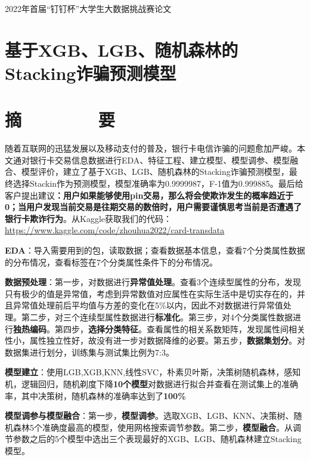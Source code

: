 \pagestyle{plain}
\lfoot{}
\rfoot{}
	\begin{center}
		\heiti {} 2022年首届“钉钉杯”大学生大数据挑战赛论文
		
		\section*{\heiti 基于XGB、LGB、随机森林的Stacking诈骗预测模型}
		\section*{\heiti 摘\ \ \ \ \ \ \ \ 要}
	\end{center}


随着互联网的迅猛发展以及移动支付的普及，银行卡电信诈骗的问题愈加严峻。本文通对银行卡交易信息数据进行EDA、特征工程、建立模型、模型调参、模型融合、模型评价，建立了基于XGB、LGB、随机森林的Stacking诈骗预测模型，最终选择Stackin作为预测模型，模型准确率为0.9999987，F-1值为0.999885。最后给客户提出建议\textbf{：用户如果能够使用pin交易，那么将会使欺诈发生的概率趋近于0；当用户发现当前交易是往期交易的数倍时，用户需要谨慎思考当前是否遭遇了银行卡欺诈行为}。从Kaggle获取我们的代码：\href{github首页}{https://www.kaggle.com/code/zhouhua2022/card-transdata}

\textbf{EDA}：导入需要用到的包，读取数据；查看数据基本信息，查看7个分类属性数据的分布情况，查看标签在7个分类属性条件下的分布情况。


\textbf{数据预处理}：第一步，对数据进行\textbf{异常值处理}。查看3个连续型属性的分布，发现只有极少的值是异常值，考虑到异常数值对应属性在实际生活中是切实存在的，并且异常值处理前后平均值与方差的变化在5\%以内，因此不对数据进行异常值处理。第二步，对三个连续型属性数据进行\textbf{标准化}。第三步，对4个分类属性数据进行\textbf{独热编码}。第四步，\textbf{选择分类特征}。查看属性的相关系数矩阵，发现属性间相关性小，属性独立性好，故没有进一步对数据降维的必要。第五步，\textbf{数据集划分}。对数据集进行划分，训练集与测试集比例为7:3。

\textbf{模型建立}：使用LGB,XGB,KNN,线性SVC，朴素贝叶斯，决策树随机森林，感知机，逻辑回归，随机剃度下降\textbf{10个模型}对数据进行拟合并查看在测试集上的准确率，其中决策树，随机森林的准确率达到了\textbf{100\%}


\textbf{模型调参与模型融合}：第一步，\textbf{模型调参}。选取XGB、LGB、KNN、决策树、随机森林5个准确度最高的模型，使用网格搜索调节参数。第二步，\textbf{模型融合}。从调节参数之后的5个模型中选出三个表现最好的XGB、LGB、随机森林建立Stacking模型。



